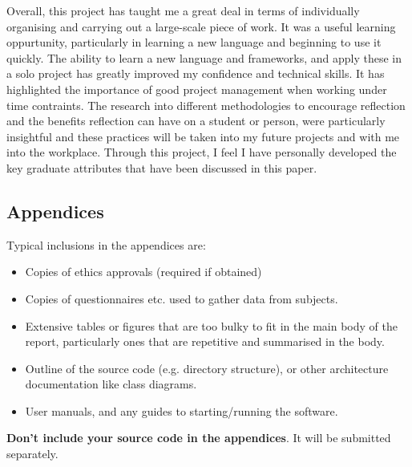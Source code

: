 \documentclass{l4proj}
\begin{document}
Overall, this project has taught me a great deal in terms of individually organising and carrying out a large-scale piece of work. It was a useful learning oppurtunity, particularly in learning a new language and beginning to use it quickly. The ability to learn a new language and frameworks, and apply these in a solo project has greatly improved my confidence and technical skills. It has highlighted the importance of good project management when working under time contraints. 
The research into different methodologies to encourage reflection and the benefits reflection can have on a student or person, were particularly insightful and these practices will be taken into my future projects and with me into the workplace. Through this project, I feel I have personally developed the key graduate attributes that have been discussed in this paper.


%
% 

\begin{appendices}

\chapter{Appendices}

Typical inclusions in the appendices are:

\begin{itemize}
\item
  Copies of ethics approvals (required if obtained)
\item
  Copies of questionnaires etc. used to gather data from subjects.
\item
  Extensive tables or figures that are too bulky to fit in the main body of
  the report, particularly ones that are repetitive and summarised in the body.

\item Outline of the source code (e.g. directory structure), or other architecture documentation like class diagrams.

\item User manuals, and any guides to starting/running the software.

\end{itemize}

\textbf{Don't include your source code in the appendices}. It will be
submitted separately.

\end{appendices}






\end{document}
